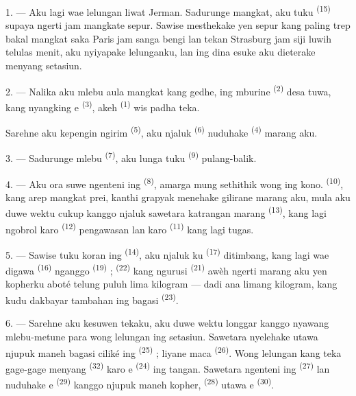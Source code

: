 1. --- Aku lagi wae lelungan liwat Jerman. Sadurunge mangkat, aku tuku
 \textsuperscript{(15)} supaya ngerti jam mangkate sepur.
Sawise mesthekake yen sepur kang paling trep bakal mangkat saka Paris
jam sanga bengi lan tekan Strasburg jam siji luwih telulas menit, aku
nyiyapake lelunganku, lan ing dina esuke aku dieterake menyang setasiun.

2. --- Nalika aku mlebu aula mangkat kang gedhe, ing mburine
 \textsuperscript{(2)} desa tuwa, kang nyangking
e \textsuperscript{(3)}, akeh  \textsuperscript{(1)} wis padha teka.

Sarehne aku kepengin ngirim  \textsuperscript{(5)}, aku
njaluk  \textsuperscript{(6)} nuduhake  \textsuperscript{(4)} marang aku.

3. --- Sadurunge mlebu  \textsuperscript{(7)}, aku
lunga tuku  \textsuperscript{(9)} pulang-balik.

4. --- Aku ora suwe ngenteni ing  \textsuperscript{(8)},
amarga mung sethithik wong ing kono. 
\textsuperscript{(10)}, kang arep mangkat prei, kanthi grapyak menehake
gilirane marang aku, mula aku duwe wektu cukup kanggo njaluk sawetara
katrangan marang  \textsuperscript{(13)}, kang
lagi ngobrol karo  \textsuperscript{(12)} pengawasan lan
karo  \textsuperscript{(11)} kang lagi tugas.

\VUsaut{3.0mm}
\VUsaut{3.0mm}

5. --- Sawise tuku koran ing  \textsuperscript{(14)},
aku njaluk ku \textsuperscript{(17)} ditimbang, kang lagi
wae digawa  \textsuperscript{(16)} nganggo  \textsuperscript{(19)} ;  \textsuperscript{(22)}
kang ngurusi  \textsuperscript{(21)} awèh ngerti marang
aku yen kopherku aboté telung puluh lima kilogram — dadi ana
 limang kilogram, kang kudu dakbayar tambahan ing
 bagasi \textsuperscript{(23)}.

6. --- Sarehne aku kesuwen tekaku, aku duwe wektu longgar kanggo
nyawang mlebu-metune para wong lelungan ing setasiun. Sawetara
nyelehake utawa njupuk maneh bagasi ciliké ing  \textsuperscript{(25)} ; liyane maca 
\textsuperscript{(26)}. Wong lelungan kang teka gage-gage menyang
 \textsuperscript{(32)} karo e
\textsuperscript{(24)} ing tangan. Sawetara ngenteni ing  \textsuperscript{(27)} lan nuduhake e
\textsuperscript{(29)} kanggo njupuk maneh kopher, 
\textsuperscript{(28)} utawa e \textsuperscript{(30)}.


